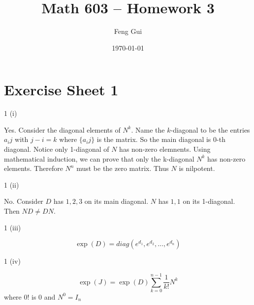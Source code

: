 \documentclass[10pt]{article}
\theoremstyle{plain}
\theoremstyle{definition}
\newenvironment{problem_hw}[1]{{\noindent\bfseries Problem #1.}}{}
\newenvironment{answer_hw}{{\noindent\em Answer.}}{}
\newcommand{\<}{\langle}
\renewcommand{\>}{\rangle}
\begin{document}
%
\title{Math 603 -- Homework 3}
\author{Feng Gui}
\date{\today}
\maketitle

\section*{Exercise Sheet 1}
\label{sec:Exercise Sheet 1}

\begin{problem_hw}{1 (i)}
\end{problem_hw}

\begin{answer_hw}

Yes. Consider the diagonal elements of $N^k$. Name the $k$-diagonal to be the entries $a_ij$ with $j-i = k$ where $\{a_ij\}$ is the matrix. So the main diagonal is 0-th diagonal. Notice only 1-diagonal of $N$ has non-zero elemnents. Using mathematical induction, we can prove that only the k-diagonal $N^k$ has non-zero elements. Therefore $N^n$ must be the zero matrix. Thus $N$ is nilpotent. \\
\end{answer_hw}

\begin{problem_hw}{1 (ii)}
\end{problem_hw}

\begin{answer_hw}

No. Consider $D$ has $1,2,3$ on its main diagonal. $N$ has $1,1$ on its 1-diagonal. Then $ND \not = DN$.\\
\end{answer_hw}

\begin{problem_hw}{1 (iii)}
\end{problem_hw}

\begin{answer_hw}
\[\exp(D) = diag(e^{d_1},e^{d_2},...,e^{d_n})\]
\end{answer_hw}


\begin{problem_hw}{1 (iv)}
\end{problem_hw}

\begin{answer_hw}
\[\exp(J) = \exp(D)\sum_{k = 0}^{n-1} \frac{1}{k!}N^k\]
where $0!$ is 0 and $N^0 = I_n$ \\
\end{answer_hw}
\end{document}
